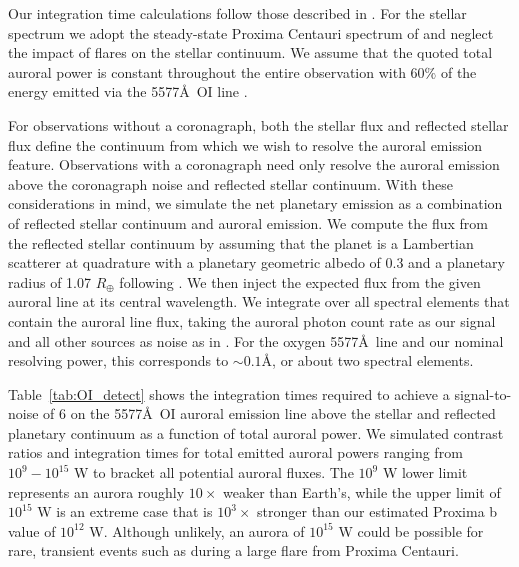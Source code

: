 \documentclass[apjl]{emulateapj}
\begin{document}
Our integration time calculations follow those described in \citet{Robinson2016}. For the stellar spectrum we adopt the steady-state Proxima Centauri spectrum of \citet{Meadows2016} and neglect the impact of flares on the stellar continuum. We assume that the quoted total auroral power is constant throughout the entire observation with $60\%$ of the energy emitted via the 5577\AA\ OI line \citep{Chamberlain1961,Kivelson1995}. 

For observations without a coronagraph, both the stellar flux and reflected stellar flux define the continuum from which we wish to resolve the auroral emission feature. Observations with a coronagraph need only resolve the auroral emission above the coronagraph noise and reflected stellar continuum.  With these considerations in mind, we simulate the net planetary emission as a combination of reflected stellar continuum and auroral emission.  We compute the flux from the reflected stellar continuum by assuming that the planet is a Lambertian scatterer at quadrature with a planetary geometric albedo of 0.3 and a planetary radius of 1.07 $R_{\oplus}$  following \citet{Barnes2016}.  We then inject the expected flux from the given auroral line at its central wavelength.  We integrate over all spectral elements that contain the auroral line flux, taking the auroral photon count rate as our signal and all other sources as noise as in \citet{Robinson2016}.  For the oxygen 5577\AA\ line and our nominal resolving power, this corresponds to ${\sim}0.1$\AA, or about two spectral elements.

Table~\ref{tab:OI_detect} shows the integration times required to achieve a signal-to-noise of 6 on the 5577\AA\ OI auroral emission line above the stellar and reflected planetary continuum as a function of total auroral power.  We simulated contrast ratios and integration times for total emitted auroral powers ranging from $10^9 - 10^{15}$ W to bracket all potential auroral fluxes.  The $10^9$ W lower limit represents an aurora roughly $10\times$ weaker than Earth's, while the upper limit of $10^{15}$ W is an extreme case that is $10^3\times$ stronger than our estimated Proxima b value of $10^{12}$ W.  Although unlikely, an aurora of $10^{15}$ W could be possible for rare, transient events such as during a large flare from Proxima Centauri.
\end{document}
